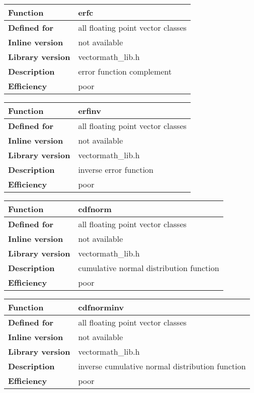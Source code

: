 \documentclass[vcl_manual.tex]{subfiles}
\begin{document}
\begin{tabular}{|p{30mm}|p{120mm}|}
\hline
\bfseries Function & erfc \\ \hline
\bfseries Defined for & all floating point vector classes \\ \hline
\bfseries Inline version & not available \\ \hline
\bfseries Library version & vectormath\_lib.h \\ \hline
\bfseries Description & error function complement \\ \hline
\bfseries Efficiency & poor \\ \hline
\end{tabular}


\begin{tabular}{|p{30mm}|p{120mm}|}
\hline
\bfseries Function & erfinv \\ \hline
\bfseries Defined for & all floating point vector classes \\ \hline
\bfseries Inline version & not available \\ \hline
\bfseries Library version & vectormath\_lib.h \\ \hline
\bfseries Description & inverse error function \\ \hline
\bfseries Efficiency & poor \\ \hline
\end{tabular}


\begin{tabular}{|p{30mm}|p{120mm}|}
\hline
\bfseries Function & cdfnorm \\ \hline
\bfseries Defined for & all floating point vector classes \\ \hline
\bfseries Inline version & not available \\ \hline
\bfseries Library version & vectormath\_lib.h \\ \hline
\bfseries Description & cumulative normal distribution function \\ \hline
\bfseries Efficiency & poor \\ \hline
\end{tabular}


\begin{tabular}{|p{30mm}|p{120mm}|}
\hline
\bfseries Function & cdfnorminv \\ \hline
\bfseries Defined for & all floating point vector classes \\ \hline
\bfseries Inline version & not available \\ \hline
\bfseries Library version & vectormath\_lib.h \\ \hline
\bfseries Description & inverse cumulative normal distribution function \\ \hline
\bfseries Efficiency & poor \\ \hline
\end{tabular}
\end{document}
